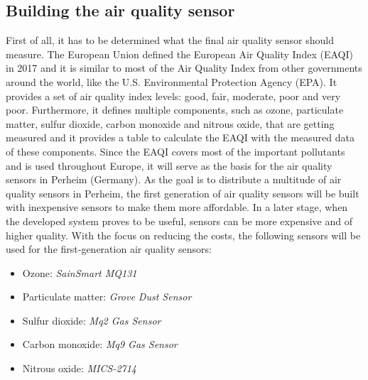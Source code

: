 \documentclass[conference]{IEEEtran}
\begin{document}
\subsection{Building the air quality sensor}
First of all, it has to be determined what the final air quality sensor should measure. The European Union defined the European Air Quality Index (EAQI) in 2017 and it is similar to most of the Air Quality Index from other governments around the world, like the U.S. Environmental Protection Agency (EPA). It provides a set of air quality index levels: good, fair, moderate, poor and very poor. Furthermore, it defines multiple components, such as ozone, particulate matter, sulfur dioxide, carbon monoxide and nitrous oxide, that are getting measured and it provides a table to calculate the EAQI with the measured data of these components. Since the EAQI covers most of the important pollutants and is used throughout Europe, it will serve as the basis for the air quality sensors in Perheim (Germany). As the goal is to distribute a multitude of air quality sensors in Perheim, the first generation of air quality sensors will be built with inexpensive sensors to make them more affordable. In a later stage, when the developed system proves to be useful, sensors can be more expensive and of higher quality. With the focus on reducing the costs, the following sensors will be used for the first-generation air quality sensors:

\begin{itemize}
\item Ozone: \textit{SainSmart MQ131}
\item Particulate matter: \textit{Grove Dust Sensor}
\item Sulfur dioxide: \textit{Mq2 Gas Sensor}
\item Carbon monoxide: \textit{Mq9 Gas Sensor}
\item Nitrous oxide: \textit{MICS-2714}
\end{itemize}
\end{document}
